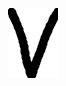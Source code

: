 \documentclass[russian,utf8,emptystyle]{eskdtext}
\begin{document}
\begin{figure}[!htb]
\includegraphics[width=\linewidth]{../data/learn/v/001}
\endminipage\hfill
{}

\end{figure}
\end{document}
